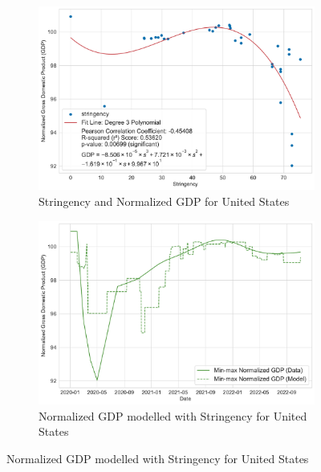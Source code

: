 \documentclass[tikz,fleqn,12pt]{wlscirep}
\begin{document}
\begin{figure}[htbp!]
  \centering
  \begin{subfigure}[t]{0.48\textwidth}
    \centering
    \includegraphics[width=\linewidth]{images/stringency_vs_gdp_USA.pdf}
    \caption{Stringency and Normalized GDP for United States}
  \end{subfigure}
  \label{fig:stringency_vs_gdp_USA}
  \hfill
  \begin{subfigure}[t]{0.48\textwidth}
    \centering
    \includegraphics[width=\linewidth]{images/gdp_modelled_with_stringency_USA.pdf}
    \caption{Normalized GDP modelled with Stringency for United States}
  \end{subfigure}
  \label{fig:gdp_modelled_with_stringency_USA}


\end{figure}
\end{document}
